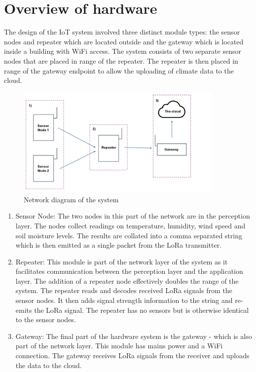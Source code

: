 \section{Overview of hardware}\label{sec:hardware-overview}

The design of the IoT system involved three distinct module types: the sensor
nodes and repeater which are located outside and the gateway which is located
inside a building with WiFi access. The system consists of two separate sensor
nodes that are placed in range of the repeater. The repeater is then placed in
range of the gateway endpoint to allow the uploading of climate data to the
cloud.

\begin{figure}[H]
      \centering
      \includegraphics[width=0.9\textwidth]{contents/part-2/fig2/network-diagram.jpg}
      \caption{Network diagram of the system}
      \label{fig:network-diagram}
\end{figure}

\begin{enumerate}
      \item Sensor Node: The two nodes in this part of the network are in the
            perception layer. The nodes collect readings on temperature, humidity,
            wind speed and soil moisture levels. The results are collated into a
            comma separated string which is then emitted as a single packet from
            the LoRa transmitter.
      \item Repeater: This module is part of the network layer of the system as it
            facilitates communication between the perception layer and the
            application layer. The addition of a repeater node effectively doubles
            the range of the system. The repeater reads and decodes received
            LoRa signals from the sensor nodes. It then adds signal strength
            information to the string and re-emits the LoRa signal. The repeater
            has no sensors but is otherwise identical to the sensor nodes.
      \item Gateway: The final part of the hardware system is the gateway - which
            is also part of the network layer. This module has mains power and a
            WiFi connection. The gateway receives LoRa signals from the receiver
            and uploads the data to the cloud.
\end{enumerate}



